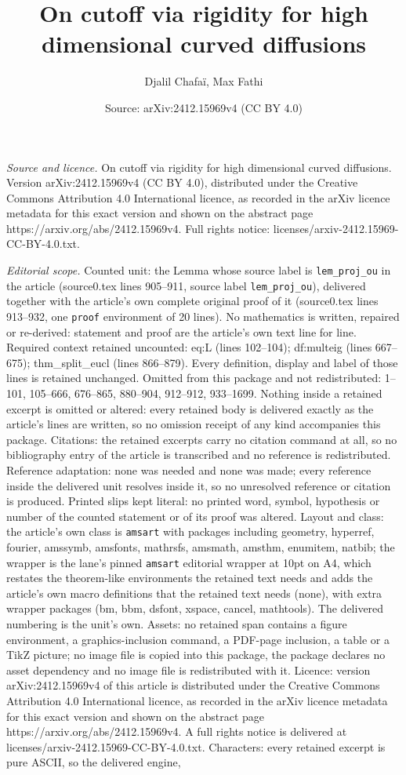 \documentclass[10pt,a4paper]{amsart}
\title[On cutoff via rigidity for high dimensional curved diffusion]{On cutoff via rigidity for high dimensional curved diffusions}
\author{Djalil Chafa\"i, Max Fathi}
\date{Source: arXiv:2412.15969v4 (CC BY 4.0)}
\begin{document}
\maketitle

\noindent\emph{Source and licence.} On cutoff via rigidity for high dimensional curved diffusions. Version arXiv:2412.15969v4 (CC BY 4.0), distributed under the Creative Commons Attribution 4.0 International licence, as recorded in the arXiv licence metadata for this exact version and shown on the abstract page https://arxiv.org/abs/2412.15969v4. Full rights notice: licenses/arxiv-2412.15969-CC-BY-4.0.txt.\par\smallskip

\noindent\textit{Editorial scope.} Counted unit: the Lemma whose source label is \texttt{lem\_proj\_ou} in the article (source0.tex lines 905--911, source label \texttt{lem\_proj\_ou}), delivered together with the article's own complete original proof of it (source0.tex lines 913--932, one \texttt{proof} environment of 20 lines). No mathematics is written, repaired or re-derived: statement and proof are the article's own text line for line. Required context retained uncounted: eq:L (lines 102--104); df:multeig (lines 667--675); thm\_split\_eucl (lines 866--879). Every definition, display and label of those lines is retained unchanged. Omitted from this package and not redistributed: 1--101, 105--666, 676--865, 880--904, 912--912, 933--1699. Nothing inside a retained excerpt is omitted or altered: every retained body is delivered exactly as the article's lines are written, so no omission receipt of any kind accompanies this package. Citations: the retained excerpts carry no citation command at all, so no bibliography entry of the article is transcribed and no reference is redistributed. Reference adaptation: none was needed and none was made; every reference inside the delivered unit resolves inside it, so no unresolved reference or citation is produced. Printed slips kept literal: no printed word, symbol, hypothesis or number of the counted statement or of its proof was altered. Layout and class: the article's own class is \texttt{amsart} with packages including geometry, hyperref, fourier, amssymb, amsfonts, mathrsfs, amsmath, amsthm, enumitem, natbib; the wrapper is the lane's pinned \texttt{amsart} editorial wrapper at 10pt on A4, which restates the theorem-like environments the retained text needs and adds the article's own macro definitions that the retained text needs (none), with extra wrapper packages (bm, bbm, dsfont, xspace, cancel, mathtools). The delivered numbering is the unit's own. Assets: no retained span contains a figure environment, a graphics-inclusion command, a PDF-page inclusion, a table or a TikZ picture; no image file is copied into this package, the package declares no asset dependency and no image file is redistributed with it. Licence: version arXiv:2412.15969v4 of this article is distributed under the Creative Commons Attribution 4.0 International licence, as recorded in the arXiv licence metadata for this exact version and shown on the abstract page https://arxiv.org/abs/2412.15969v4. A full rights notice is delivered at licenses/arxiv-2412.15969-CC-BY-4.0.txt. Characters: every retained excerpt is pure ASCII, so the delivered engine, 
\end{document}
